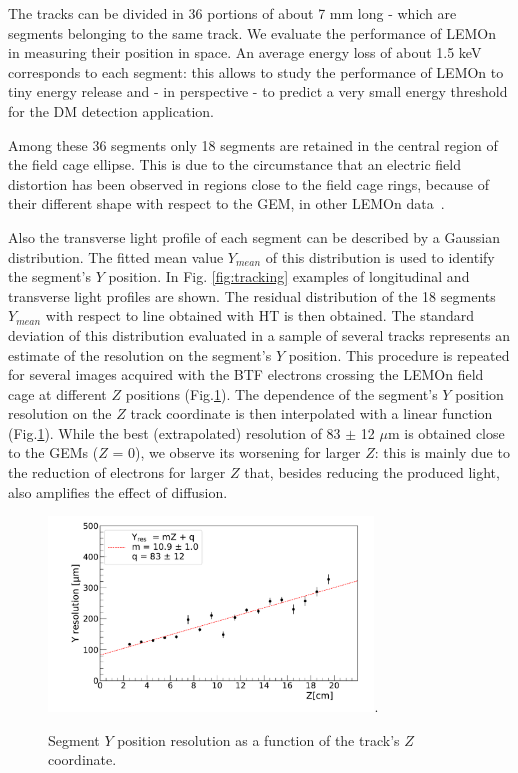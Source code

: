 \documentclass[%
 aip,
 amsmath,amssymb,
 reprint,%
]{revtex4-1}
\begin{document}
 The tracks can be divided in 36 portions of about 7 mm long - which are segments belonging to  the same  track. We evaluate the performance of LEMOn in  measuring their  position in space. An average energy loss of about 1.5 keV corresponds to each segment:  this allows to study the performance of LEMOn to tiny energy release and  - in perspective -  to predict  a very small energy threshold for the DM detection application.
 
  Among these 36 segments only 18 segments are retained in the central region of the field cage ellipse. This is due to the circumstance that an electric field distortion has been observed in regions close to the field cage rings, because of their different shape with respect to the GEM, in other LEMOn data~\cite{Costa:2019tnu}.
  
  Also the transverse  light profile of each segment can be described by  a Gaussian distribution. The fitted mean value  $Y_{mean}$ of this distribution  is used to identify the segment's $Y$ position. In Fig. \ref{fig:tracking}   examples of longitudinal and transverse light profiles are shown. 
  The residual distribution of the 18 segments $Y_{mean}$ with respect to line obtained with HT is then  obtained. The standard deviation of this distribution evaluated in a sample of several tracks represents an estimate of the resolution on the segment's $Y$ position. This procedure is repeated for several images acquired with the BTF electrons  crossing the LEMOn field cage at different $Z$ positions (Fig.\ref{fig:XYres}).
The  dependence of the segment's $Y$ position resolution  on the $Z$ track coordinate is then interpolated with a linear function (Fig.\ref{fig:XYres}). While the best (extrapolated) resolution  of 83 $\pm$ 12 $\mu$m is obtained close to the GEMs ($Z$ = 0), we observe its worsening for larger $Z$: this is mainly due to the reduction of electrons for larger $Z$ that, besides reducing the produced light, also amplifies the effect of diffusion.


\begin{figure}[!ht]
\centering
\includegraphics[width=3.4in]{Fig8-Resolution-Z.pdf}\DeclareGraphicsExtensions.
\caption{ Segment $Y$ position resolution  as a function of the track's $Z$ coordinate.}
\label{fig:XYres}
\end{figure}
\end{document}
